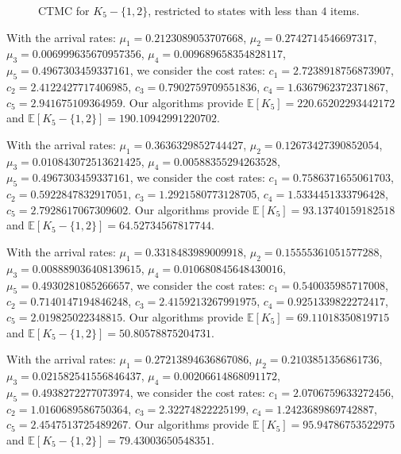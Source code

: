 \documentclass[11pt]{article}
\begin{document}
\begin{figure} [htbp]
\begin{center}
	\end{center}
	\caption{CTMC for $K_5-\{1,2\}$, restricted to states with less than $4$ items. \label{secondmodel}}
\end{figure}
With the arrival rates: $\mu_1=0.2123089053707668$, $\mu_2=0.2742714546697317$,
$\mu_3=0.006999635670957356$,
$\mu_4=0.009689658354828117$,
$\mu_5=0.4967303459337161$,
we consider the cost rates:
$c_1=2.7238918756873907$,
$c_2=2.4122427717406985$,
$c_3=0.7902759709551836$,
$c_4=1.6367962372371867$,
$c_5=2.941675109364959$. Our
algorithms provide $\mathbb{E}[K_5]=220.65202293442172$ and $\mathbb{E}[K_5-\{1,2\}]=190.10942991220702$.

With the arrival rates: $\mu_1=0.3636329852744427$, $\mu_2=0.12673427390852054$,
$\mu_3=0.010843072513621425$,
$\mu_4=0.00588355294263528$,
$\mu_5=0.4967303459337161$,
we consider the cost rates:
$c_1=0.7586371655061703$,
$c_2=0.5922847832917051$,
$c_3=1.2921580773128705$,
$c_4=1.5334451333796428$,
$c_5=2.7928617067309602$. Our
algorithms provide $\mathbb{E}[K_5]=93.13740159182518$ and $\mathbb{E}[K_5-\{1,2\}]=64.52734567817744$.

With the arrival rates: $\mu_1=0.3318483989009918$, $\mu_2=0.15555361051577288$,
$\mu_3=0.008889036408139615$,
$\mu_4=0.010680845648430016$,
$\mu_5=0.4930281085266657$,
we consider the cost rates:
$c_1=0.540035985717008$,
$c_2=0.7140147194846248$,
$c_3=2.4159213267991975$,
$c_4=0.9251339822272417$,
$c_5=2.019825022348815$. Our
algorithms provide $\mathbb{E}[K_5]=69.11018350819715$ and $\mathbb{E}[K_5-\{1,2\}]=50.80578875204731$.

With the arrival rates: $\mu_1=0.27213894636867086$, $\mu_2=0.2103851356861736$,
$\mu_3=0.021582541556846437$,
$\mu_4=0.00206614868091172$,
$\mu_5=0.4938272277073974$,
we consider the cost rates:
$c_1=2.0706759633272456$,
$c_2=1.0160689586750364$,
$c_3=2.32274822225199$,
$c_4=1.2423689869742887$,
$c_5=2.4547513725489267$. Our
algorithms provide $\mathbb{E}[K_5]=95.94786753522975$ and $\mathbb{E}[K_5-\{1,2\}]=79.43003650548351$.
\end{document}
